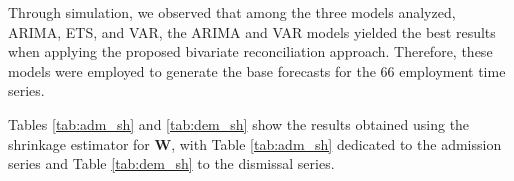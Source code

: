 \documentclass[a4paper,preprint,11pt,authoryear]{elsarticle}
\DeclareMathOperator{\RelRMSE}{RelRMSE}
\DeclareMathOperator{\Base}{Base}
\begin{document}
Through simulation, we observed that among the three models analyzed, ARIMA, ETS, and VAR, the ARIMA and VAR models yielded the best results when applying the proposed bivariate reconciliation approach. Therefore, these models were employed to generate the base forecasts for the 66 employment time series.

Tables \ref{tab:adm_sh} and \ref{tab:dem_sh} show the results obtained using the shrinkage estimator for $\bm{W}$, with Table \ref{tab:adm_sh} dedicated to the admission series and Table \ref{tab:dem_sh} to the dismissal series.



\end{document}
